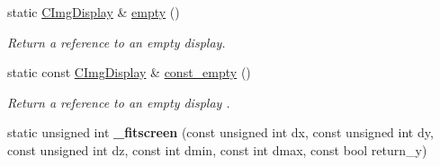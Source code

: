 \begin{DoxyCompactItemize}
\item 
static \hyperlink{structcimg__library__suffixed_1_1CImgDisplay}{C\+Img\+Display} \& \hyperlink{structcimg__library__suffixed_1_1CImgDisplay_a5201b74be1def5e07ec735422b2ef066}{empty} ()
\begin{DoxyCompactList}\small\item\em Return a reference to an empty display. \end{DoxyCompactList}\item 
\mbox{\label{structcimg__library__suffixed_1_1CImgDisplay_a85bf8aba20ff7d405eac924840acf692}} 
static const \hyperlink{structcimg__library__suffixed_1_1CImgDisplay}{C\+Img\+Display} \& \hyperlink{structcimg__library__suffixed_1_1CImgDisplay_a85bf8aba20ff7d405eac924840acf692}{const\+\_\+empty} ()
\begin{DoxyCompactList}\small\item\em Return a reference to an empty display . \end{DoxyCompactList}\item 
\mbox{\label{structcimg__library__suffixed_1_1CImgDisplay_a7fef297dd2ab82550718fcb7751c66bc}} 
static unsigned int {\bfseries \+\_\+fitscreen} (const unsigned int dx, const unsigned int dy, const unsigned int dz, const int dmin, const int dmax, const bool return\+\_\+y)
\end{DoxyCompactItemize}
